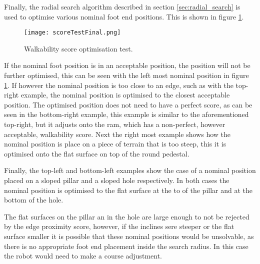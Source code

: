     \noindent
    Finally, the radial search algorithm described in section \ref{sec:radial_search} is used to optimise various nominal foot end positions.
    This is shown in figure \ref{fig:optimisation_test}.
    \newpage
    \begin{figure}[h]
        \centering
        \texttt{[image: scoreTestFinal.png]}
        \caption{Walkability score optimisation test.}
        \label{fig:optimisation_test}
    \end{figure}

    \noindent
    If the nominal foot position is in an acceptable position, the position will not be further optimised, this can be seen with the left most
    nominal position in figure \ref{fig:optimisation_test}. If however the nominal position is too close to an edge, such as with the top-right example, 
    the nominal position is optimised to the closest acceptable position. The optimised position does not need to have a perfect score, as can be seen in the bottom-right example, this example is similar to 
    the aforementioned top-right, but it adjusts onto the ram, which has a non-perfect, however acceptable, walkability score.
    Next the right most example shows how the nominal position is place on a piece of terrain that is too steep, this it is optimised onto the flat surface on top of the round pedestal. 
    
    Finally, the top-left and bottom-left examples show the case of a nominal position placed on a sloped pillar and a sloped hole respectively.
    In both cases the nominal position is optimised to the flat surface at the to of the pillar and at the bottom of the hole.
    
    The flat surfaces on the pillar an in the hole are large enough to not be rejected by the edge proximity score, however, if the inclines sere steeper or the flat surface smaller it is possible that these nominal positions would be
    unsolvable, as there is no appropriate foot end placement inside the search radius. In this case the robot would need to make a course adjustment.

    \newpage
